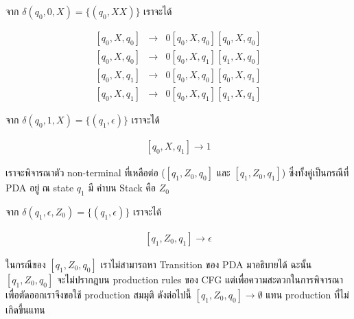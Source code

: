 \par{
จาก $\delta(q_0, 0, X) = \{(q_0, XX)\}$ เราจะได้

\begin{eqnarray*}
\left[q_0, X, q_0\right] & \rightarrow & 0[q_0, X, q_0][q_0, X, q_0] \\
\left[q_0, X, q_0\right] & \rightarrow & 0[q_0, X, q_1][q_1, X, q_0] \\
\left[q_0, X, q_1\right] & \rightarrow & 0[q_0, X, q_0][q_0, X, q_1]\\
\left[q_0, X, q_1\right] & \rightarrow & 0[q_0, X, q_1][q_1, X, q_1]
\end{eqnarray*}
}

\par{
จาก $\delta(q_0, 1, X) = \{(q_1, \epsilon)\}$ เราจะได้

\begin{eqnarray*}
\left[q_0, X, q_1\right] \rightarrow 1
\end{eqnarray*}
}

\par{
เราจะพิจารณาตัว non-terminal ที่เหลือต่อ ($[q_1, Z_0, q_0]$ และ $[q_1, Z_0, q_1]$) ซึ่งทั้งคู่เป็นกรณีที่ PDA อยู่ ณ state $q_1$ มี ค่าบน Stack คือ $Z_0$
}

\par{
จาก $\delta(q_1, \epsilon, Z_0) = \{(q_1, \epsilon)\}$ เราจะได้

\begin{eqnarray*}
\left[q_1, Z_0, q_1\right] \rightarrow \epsilon
\end{eqnarray*}

ในกรณีของ $[q_1, Z_0, q_0]$ เราไม่สามารถหา Transition ของ PDA มาอธิบายได้ ฉะนั้น $[q_1, Z_0, q_0]$ จะไม่ปรากฎบน production rules ของ CFG แต่เพื่อความสะดวกในการพิจารณาเพื่อตัดออกเราจึงขอใช้ production สมมุติ ดังต่อไปนี้ $[q_1, Z_0, q_0] \rightarrow \emptyset$ แทน production ที่ไม่เกิดขึ้นแทน 
}

